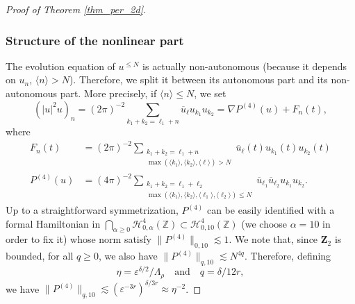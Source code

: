 \begin{proof}[Proof of Theorem \ref{thm_per_2d}]
\subsubsection*{Structure of the nonlinear part}
The evolution equation of $u^{\leq N}$ is actually non-autonomous (because it depends on $u_n$, $\langle n \rangle >N$). Therefore, we split it between its autonomous part and its non-autonomous part. More precisely, if $\langle n \rangle \leq N$, we set
\[
(|u|^2 u)_n = (2\pi)^{-2} \sum_{k_1+k_2=\ell_1+n} \overline{u}_{\ell} u_{k_1} u_{k_2} = \nabla P^{(4)}(u)+F_n(t),
\]
where
\begin{align*}
F_n(t) &= (2\pi)^{-2} \! \! \! \! \! \sum_{\substack{
k_1+k_2=\ell_1+n\\
\max(\langle k_1 \rangle, \langle k_2 \rangle,\langle \ell \rangle)>N}} \! \! \! \! \! \overline{u}_{\ell}(t) u_{k_1}(t) u_{k_2}(t)
\\
\tag*{and}
P^{(4)}(u) &= (4\pi)^{-2} \! \! \! \! \! \! \! \! \! \sum_{ \substack{k_1+k_2=\ell_1+\ell_2\\ \max(\langle k_1 \rangle, \langle k_2 \rangle,\langle \ell_1 \rangle,\langle \ell_2 \rangle)\leq N } } \! \! \! \! \! \overline{u}_{\ell_1} \overline{u}_{\ell_2} u_{k_1} u_{k_2}.
\end{align*}
Up to a straightforward symmetrization, $P^{(4)}$ can be easily identified with a formal Hamiltonian in $\bigcap_{\alpha\geq 0}\mathscr{H}_{0,\alpha}^{4}(\mathbb{Z}) \subset \mathscr{H}_{0,10}^{4}(\mathbb{Z}) $ (we choose $\alpha=10$ in order to fix it) whose norm satisfy $\|P^{(4)} \|_{0,10} \lesssim 1$. We note that, since $\mathbf{Z}_2$ is bounded, for all $q\geq 0$, we also have $\|P^{(4)} \|_{q,10} \lesssim N^{4q}$. Therefore, defining
\[
\eta = \varepsilon^{\delta/2}/\Lambda_\rho \quad \text{and} \quad q=\delta/12r,
\]
we have $\|P^{(4)} \|_{q,10} \lesssim (\varepsilon^{-3r})^{\delta/3r}\approx \eta^{-2}$.


\end{proof}
